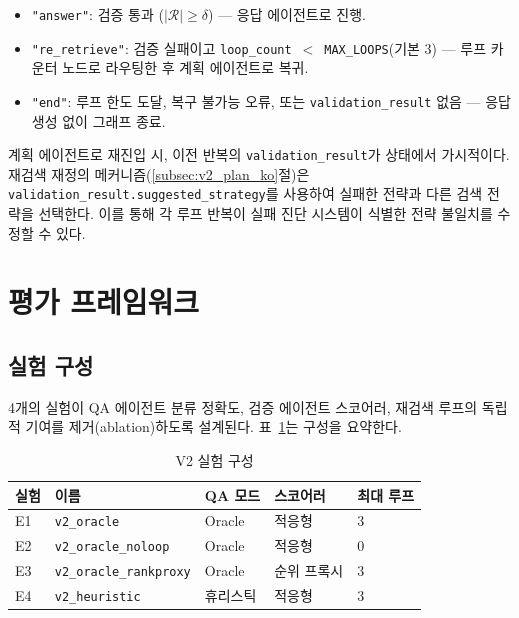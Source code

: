 \begin{itemize}
  \item \texttt{"answer"}: 검증 통과 ($|\mathcal{R}| \geq \delta$) --- 응답 에이전트로 진행.
  \item \texttt{"re\_retrieve"}: 검증 실패이고 \texttt{loop\_count}~$<$~\texttt{MAX\_LOOPS}(기본 3) --- 루프 카운터 노드로 라우팅한 후 계획 에이전트로 복귀.
  \item \texttt{"end"}: 루프 한도 도달, 복구 불가능 오류, 또는 \texttt{validation\_result} 없음 --- 응답 생성 없이 그래프 종료.
\end{itemize}

계획 에이전트로 재진입 시, 이전 반복의 \texttt{validation\_result}가 상태에서 가시적이다. 재검색 재정의 메커니즘(\ref{subsec:v2_plan_ko}절)은 \texttt{validation\_result.suggested\_strategy}를 사용하여 실패한 전략과 다른 검색 전략을 선택한다. 이를 통해 각 루프 반복이 실패 진단 시스템이 식별한 전략 불일치를 수정할 수 있다.

\section{평가 프레임워크}
\label{sec:v2_eval_framework_ko}

\subsection{실험 구성}
\label{subsec:v2_experiments_ko}

4개의 실험이 QA 에이전트 분류 정확도, 검증 에이전트 스코어러, 재검색 루프의 독립적 기여를 제거(ablation)하도록 설계된다. 표~\ref{tab:v2_experiments_ko}는 구성을 요약한다.

\begin{table}[H]
\centering
\caption{V2 실험 구성}
\label{tab:v2_experiments_ko}
\begin{tabular}{lllll}
\toprule
\textbf{실험} & \textbf{이름} & \textbf{QA 모드} & \textbf{스코어러} & \textbf{최대 루프} \\
\midrule
E1 & \texttt{v2\_oracle}            & Oracle    & 적응형       & 3 \\
E2 & \texttt{v2\_oracle\_noloop}    & Oracle    & 적응형       & 0 \\
E3 & \texttt{v2\_oracle\_rankproxy} & Oracle    & 순위 프록시  & 3 \\
E4 & \texttt{v2\_heuristic}         & 휴리스틱  & 적응형       & 3 \\
\bottomrule
\end{tabular}
\end{table}

